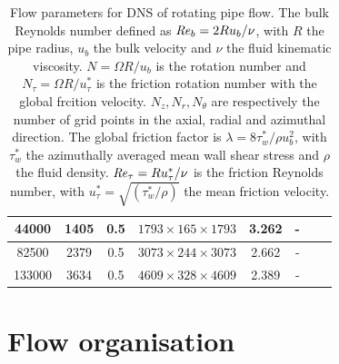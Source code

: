 \documentclass[lineno]{jfm}
\begin{document}
\begin{table}
\begin{center}
\begin{tabular}{cccccccc}
	 			\midrule
	 			44000  & 1405  & 0.5  & $1793 \times 165 \times 1793$ & 3.262& -\\
	 			\midrule
	 			82500  & 2379  & 0.5  & $3073 \times 244 \times 3073$ & 2.662& -\\
	 			\midrule
	 			133000 & 3634  & 0.5  & $4609 \times 328 \times 4609$ & 2.389& -\\
	 			\bottomrule
	 		\end{tabular}
	 		\caption{Flow parameters for DNS of rotating pipe flow.
	 			The bulk Reynolds number defined as $\mbox{\textit{Re}}_b = 2 R u_b/\nu$, with $R$ 
	 			the pipe radius, $u_b$ the bulk velocity and 
	 			$\nu$ the fluid kinematic viscosity.
	 			$N = \Omega R/u_b$ is the rotation number 
	 			and $N_\tau = \Omega R/u^*_{\tau}$ is the friction rotation number
	 			with the global frcition velocity.
	 			$N_z, N_r, N_\theta$ are respectively the number of grid points in the axial,
	 			radial and azimuthal direction.
	 			The global friction factor is $\lambda = 8 \tau_w^* / \rho u_b^2$, with
	 			$\tau_w^*$ the azimuthally averaged mean wall shear stress and $\rho$ the fluid density.
	 			$\mbox{\textit{Re}}_{\tau} = R u^*_{\tau} / \nu$ is the friction Reynolds number,
	 			with $u^*_{\tau} = \sqrt{(\tau_w^*/\rho)}$ the mean friction velocity.
	 		} 
	 		\label{tab:runs} 
	 		\end{center}
 		\end{table}
	 
	\section{Flow organisation} \label{sec:flow}
\end{document}
